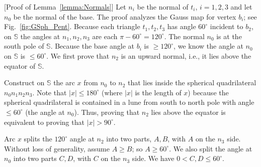 \documentclass[11pt]{article}
\newcommand{\ABox}{
\raisebox{3pt}{\framebox[6pt]{\rule{6pt}{0pt}}}
}
\newenvironment{proof}{{\bf Proof:}}{\hfill\ABox\medskip}
\newcommand{\lemref}[1]{\ref{lemma:#1}}
\newcommand{\figref}[1]{\ref{fig:#1}}
\def\S{{\mathbb{S}}}
\newcommand{\Anna}[1]{{\color{red} Anna: [#1]}}
\begin{document}
\begin{proof} [Proof of Lemma~\lemref{Normals}]
Let $n_i$ be the normal of $t_i$, $i=1,2,3$ and let $n_0$ be the normal of the base.
The proof analyzes the Gauss map 
for vertex $b_i$;
see Fig.~\figref{GSph_Pent}.
Because each triangle $t_1, t_2, t_3$ has angle $60^\circ$ incident to $b_2$,
on $\S$ the angles at $n_1,n_2,n_3$ are each $\pi-60^\circ=120^\circ$.
The normal 
$n_0$ is at the south pole of $\S$.
Because 
the base angle at $b_i$ is $\ge 120^\circ$,
we know the angle at $n_0$ on $\S$ is $\le 60^\circ$.
We first prove that $n_2$ is an upward normal, i.e., it lies above the equator
of $\S$.

Construct on $\S$ the arc $x$ from $n_0$ to $n_2$ that lies inside 
the spherical
quadrilateral $n_0 n_1 n_2 n_3$. 
Note that  $|x| \le 180^\circ$  (where $|x|$ is the length of $x$) because the spherical quadrilateral is contained in a lune from south to north pole with angle $\le  60^\circ$ (the angle at $n_0$).
Thus, proving that $n_2$ lies above the equator is equivalent to proving that $|x| > 90^\circ$.









%
Arc $x$ splits the $120^\circ$ angle at $n_2$ into two parts, $A,B$, with $A$ on the $n_3$ side. 
Without loss of generality, assume $A \ge B$; so $A \ge 60^\circ$.  We also split the angle at $n_0$ into two parts $C,D$, with $C$ on the $n_3$ side.  We have $0 < C,D \le 60^\circ$. 


\end{proof}
\end{document}
